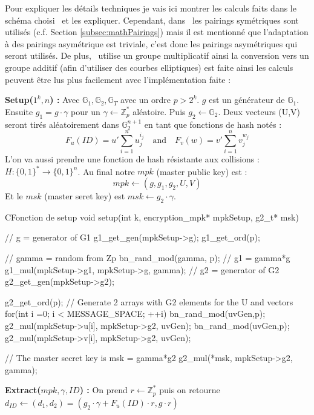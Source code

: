 Pour expliquer les détails techniques je vais ici montrer les calculs faits dans le schéma choisi~\cite{DBLP:conf/pkc/DentLP08} et les expliquer. Cependant, dans~\cite{DBLP:conf/pkc/DentLP08} les pairings symétriques sont utilisés (c.f. Section \ref{subsec:mathPairings}) mais il est mentionné que l'adaptation à des pairings asymétrique est triviale, c'est donc les pairings asymétriques qui seront utilisés. De plus,~\cite{DBLP:conf/pkc/DentLP08} utilise un groupe multiplicatif ainsi la conversion vers un groupe additif (afin d'utiliser des courbes elliptiques) est faite ainsi les calculs peuvent être lus plus facilement avec l'implémentation faite :

\textbf{Setup($1^k, n$) :} Avec $\mathbb{G}_1, \mathbb{G}_2, \mathbb{G}_T$ avec un ordre $p > 2^k$. $g$ est un générateur de $\mathbb{G}_1$. Ensuite  $g_1 = g \cdot \gamma$ pour un $\gamma \leftarrow  \mathbb{Z}_p^*$ aléatoire. Puis $g_2 \leftarrow \mathbb{G}_2$. Deux vecteurs (U,V) seront tirés aléatoirement dans $\mathbb{G}_2^{n+1}$ en tant que fonctions de hash notés :
\[F_u(ID) = u' \sum_{i=1}^{n} u_j^{i_j}\quad\mathrm{and}\quad F_v(w) = v' \sum_{i=1}^{n} v_j^{w_j}\]
L'on va aussi prendre une fonction de hash résistante aux collisions : $H : \{0,1\}^* \rightarrow \{0,1\}^n$. Au final notre $mpk$ (master public key) est :
\[mpk \leftarrow (g, g_1, g_2, U, V)\]
Et le $msk$ (master seret key) est $msk \leftarrow g_2 \cdot \gamma$.

\begin{sourcebox}{C}{Fonction de setup}
	void setup(int k, encryption_mpk* mpkSetup, g2_t* msk){
		// g = generator of G1
		g1_get_gen(mpkSetup->g);
		g1_get_ord(p);
		
		// gamma = random from Zp
		bn_rand_mod(gamma, p);
		// g1 = gamma*g
		g1_mul(mpkSetup->g1, mpkSetup->g, gamma);
		// g2 = generator of G2
		g2_get_gen(mpkSetup->g2);
		
		g2_get_ord(p);
		// Generate 2 arrays with G2 elements for the U and  vectors
		for(int i =0; i < MESSAGE_SPACE; ++i){
			bn_rand_mod(uvGen,p);
			g2_mul(mpkSetup->u[i], mpkSetup->g2, uvGen);
			bn_rand_mod(uvGen,p);
			g2_mul(mpkSetup->v[i], mpkSetup->g2, uvGen);
		}
		
		// The master secret key is msk = gamma*g2
		g2_mul(*msk, mpkSetup->g2, gamma);
	}
\end{sourcebox}

\textbf{Extract($mpk, \gamma, ID$) :} On prend $r \leftarrow \mathbb{Z}_p^*$ puis on retourne $d_{ID} \leftarrow (d_1, d_2) = (g_2 \cdot \gamma + F_u(ID) \cdot r, g \cdot r)$


